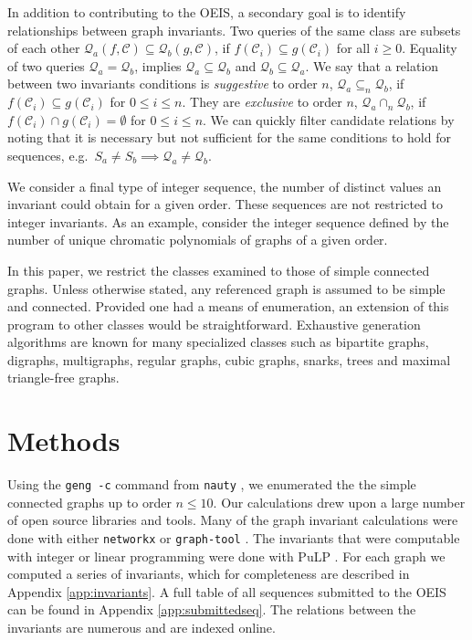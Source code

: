 \documentclass[12pt]{article}
\newcommand{\SEQ}{S}
\newcommand{\QUERY}{\mathcal{Q}}
\newcommand{\CLASS}{\mathcal{C}}
\newcommand{\eg}[0]{e.g.\ }
\begin{document}
In addition to contributing to the OEIS, a secondary goal is to identify relationships between graph invariants.
Two queries of the same class are subsets of each other $\QUERY_a(f,\CLASS) \subseteq \QUERY_b(g, \CLASS)$, if $f(\CLASS_i) \subseteq g(\CLASS_i)$ for all $i\ge0$. 
Equality of two queries $\QUERY_a = \QUERY_b$, implies $\QUERY_a \subseteq \QUERY_b$ and $\QUERY_b \subseteq \QUERY_a$. 
We say that a relation between two invariants conditions is \textit{suggestive} to order $n$, $\QUERY_a \subseteq_n \QUERY_b$, if $f(\CLASS_i) \subseteq g(\CLASS_i)$ for $0 \le i \le n$.
They are \textit{exclusive} to order $n$, $\QUERY_a \cap_n \QUERY_b$, if $f(\CLASS_i) \cap g(\CLASS_i) = \emptyset$ for $0 \le i \le n$.
We can quickly filter candidate relations by noting that it is necessary but not sufficient for the same conditions to hold for sequences, \eg $\SEQ_a \ne \SEQ_b \implies  \QUERY_a \ne \QUERY_b$.

We consider a final type of integer sequence, the number of distinct values an invariant could obtain for a given order.
These sequences are not restricted to integer invariants. 
As an example, consider the integer sequence defined by the number of unique chromatic polynomials of graphs of a given order.

In this paper, we restrict the classes examined to those of simple connected graphs.
Unless otherwise stated, any referenced graph is assumed to be simple and connected.
Provided one had a means of enumeration, an extension of this program to other classes would be straightforward.
Exhaustive generation algorithms are known for many specialized classes such as bipartite graphs, digraphs, multigraphs, regular graphs, cubic graphs, snarks, trees and maximal triangle-free graphs\cite{mckay2014practical, meringer1999fast, brinkmann2011generation, brinkmann2013generation, sawada2006generating, brinkmann2012ramsey}. 

\section{Methods}

Using the \texttt{geng -c} command from \texttt{nauty} \cite{mckay2014practical}, we enumerated the the simple connected graphs up to order $n \le 10$.
Our calculations drew upon a large number of open source libraries and tools. 
Many of the graph invariant calculations were done with either \texttt{networkx} \cite{SciPyProceedings_11} or \texttt{graph-tool} \cite{Tiago2014graph}.
The invariants that were computable with integer or linear programming were done with PuLP \cite{mitchell2011pulp}.
For each graph we computed a series of invariants, which for completeness are described in Appendix \ref{app:invariants}.
A full table of all sequences submitted to the OEIS can be found in Appendix \ref{app:submittedseq}.
The relations between the invariants are numerous and are indexed online\cite{Travis2014Encyclopdia}.
\end{document}
